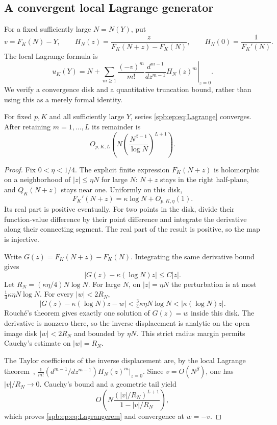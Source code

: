 \subsection{A convergent local Lagrange generator}
For a fixed sufficiently large $N=N(Y)$, put
\begin{equation}\label{spb:ep:eq:HN}
 v=F_K(N)-Y,\qquad
 H_N(z)=\frac{z}{F_K(N+z)-F_K(N)},\qquad H_N(0)=\frac1{F_K'(N)}.
\end{equation}
The local Lagrange formula is
\begin{equation}\label{spb:ep:eq:Lagrange}
 u_K(Y)=N+\sum_{m\ge1}\frac{(-v)^m}{m!}
       \left.\frac{d^{m-1}}{dz^{m-1}}H_N(z)^m\right|_{z=0}.
\end{equation}
We verify a convergence disk and a quantitative truncation bound, rather
than using this as a merely formal identity.

\begin{proposition}\label{spb:ep:prop:Lagrange}
For fixed $p,K$ and all sufficiently large $Y$, series
\eqref{spb:ep:eq:Lagrange} converges. After retaining $m=1,\ldots,L$ its remainder is
\begin{equation}\label{spb:ep:eq:Lagrangerem}
 O_{p,K,L}\left(N\left(\frac{N^{\beta-1}}{\log N}\right)^{L+1}\right).
\end{equation}
\end{proposition}
\begin{proof}
Fix $0<\eta<1/4$. The explicit finite expression $F_K(N+z)$ is holomorphic
on a neighborhood of $|z|\le\eta N$ for large $N$: $N+z$ stays in the
right half-plane, and $Q_K(N+z)$ stays near one.
Uniformly on this disk,
\[
 F_K'(N+z)=\kappa\log N+O_{p,K,\eta}(1).
\]
Its real part is positive eventually. For two points in the disk, divide
their function-value difference by their point difference and integrate
the derivative along their connecting segment. The real part of the
result is positive, so the map is injective.

Write $G(z)=F_K(N+z)-F_K(N)$. Integrating the same derivative bound gives
\[
 |G(z)-\kappa(\log N)z|\le C|z|.
\]
Let $R_N=(\kappa\eta/4)N\log N$.
For large $N$, on $|z|=\eta N$ the perturbation is at most
$\tfrac14\kappa\eta N\log N$. For every $|w|<2R_N$,
\[
 |G(z)-\kappa(\log N)z-w|
      <\tfrac34\kappa\eta N\log N
      <|\kappa(\log N)z|.
\]
Rouch\'e's theorem gives exactly one solution of $G(z)=w$ inside this disk.
The derivative is nonzero there, so the inverse displacement is analytic
on the open image disk $|w|<2R_N$ and bounded by $\eta N$.
This strict radius margin permits Cauchy's estimate on $|w|=R_N$.

The Taylor coefficients of the inverse displacement are, by the local
Lagrange theorem~\cite{dlmf},
$\frac1{m!}(d^{m-1}/dz^{m-1})H_N(z)^m|_{z=0}$.
Since $v=O(N^\beta)$, one has $|v|/R_N\to0$.
Cauchy's bound and a geometric tail yield
\[
 O\left(N\frac{(|v|/R_N)^{L+1}}{1-|v|/R_N}\right),
\]
which proves \eqref{spb:ep:eq:Lagrangerem} and convergence at $w=-v$.
\end{proof}

